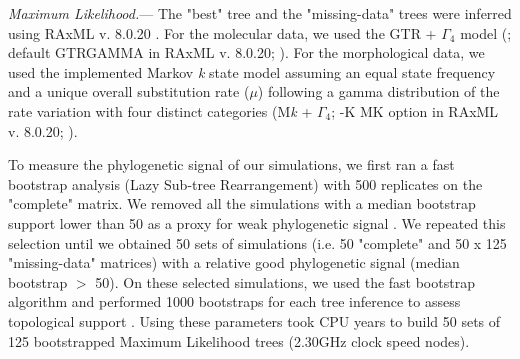 \documentclass[12pt,letterpaper]{article}
\renewcommand{\subsubsection}[1]{%
\vspace{2ex}
\noindent
\textit{#1.}---}
\begin{document}
\subsubsection{Maximum Likelihood}
The "best" tree and the "missing-data" trees were inferred using RAxML v. 8.0.20 \citep{Stamatakis21012014}. For the molecular data, we used the GTR + $\Gamma_4$ model (\citealt{tavare1986}; default GTRGAMMA in RAxML v. 8.0.20; \citealt{Stamatakis21012014}).%
For the morphological data, we used the implemented Markov \textit{k} state model \citep{lewisa2001} %
 assuming an equal state frequency and a unique overall substitution rate ($\mu$) following a gamma distribution of the rate variation with four distinct categories (M\textit{k} + $\Gamma_4$; -K MK option in RAxML v. 8.0.20; \citealt{Stamatakis21012014}).

To measure the phylogenetic signal of our simulations, we first ran a fast bootstrap analysis (Lazy Sub-tree Rearrangement) with 500 replicates on the "complete" matrix. We removed all the simulations with a median bootstrap support lower than 50 as a proxy for weak phylogenetic signal \citep{zanderminimal2004}. We repeated this selection until we obtained 50 sets of simulations (i.e. 50 "complete" and 50 x 125 "missing-data" matrices) with a relative good phylogenetic signal (median bootstrap $>$ 50). On these selected simulations, we used the fast bootstrap algorithm and performed 1000 bootstraps for each tree inference to assess topological support \citep{pattengale2010many}.
Using these parameters took  CPU years to build 50 sets of 125 bootstrapped Maximum Likelihood trees (2.30GHz clock speed nodes).
\end{document}

